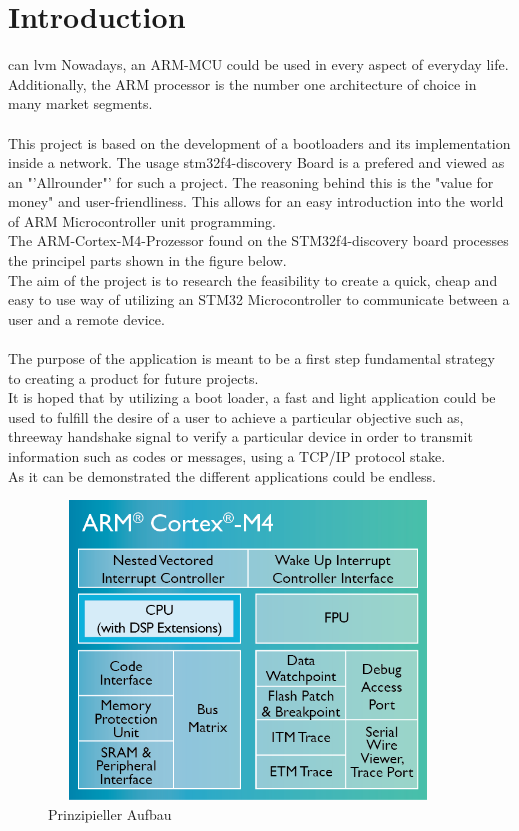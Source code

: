 \chapter{Introduction}

\gls{can}
\acrfull{lvm}
Nowadays, an ARM-MCU could be used in every aspect of everyday life.
Additionally, the ARM processor is the number one architecture of choice in 
many market segments.\\\\ 
This project is based on the development of a bootloaders and its implementation 
inside a network. The usage stm32f4-discovery Board is a prefered and viewed as an 
"'Allrounder"' for such a project. The reasoning behind this is the "value for money" 
and user-friendliness. This allows for an easy introduction into the world of ARM
Microcontroller unit programming.\\
The ARM-Cortex-M4-Prozessor found on the STM32f4-discovery board processes 
the principel parts shown in the figure below.\\
The aim of the project is to research the feasibility to create a quick, cheap 
and easy to use way of utilizing an STM32 Microcontroller to communicate between 
a user and a remote device.\\\\
The purpose of the application is meant to be a first step fundamental strategy to 
creating a product for future projects.\\
It is hoped that by utilizing a boot loader, a fast and light application could 
be used to fulfill the desire of a user to achieve a particular objective such 
as, threeway handshake signal to verify a particular device in order to transmit 
information such as codes or messages, using a TCP/IP protocol stake.\\
As it can be demonstrated the different applications could be endless.\\ 

\begin{figure}[ht]
	\centering
	\includegraphics[width=400px, height=300px]{../img/Cortex-M4-chip-diagram-LG.png}
	\caption{Prinzipieller Aufbau}
	\label{m4_prinzip}
\end{figure}

